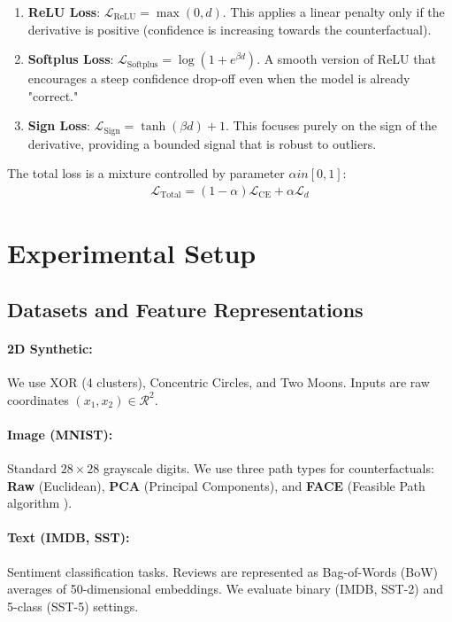 \documentclass[sigconf,anonymous]{aamas}
\begin{document}
\begin{enumerate}
    \item \textbf{ReLU Loss}: $\mathcal{L}_{\text{ReLU}} = \max(0, d)$. This applies a linear penalty only if the derivative is positive (confidence is increasing towards the counterfactual).
    \item \textbf{Softplus Loss}: $\mathcal{L}_{\text{Softplus}} = \log(1 + e^{\beta d})$. A smooth version of ReLU that encourages a steep confidence drop-off even when the model is already "correct."
    \item \textbf{Sign Loss}: $\mathcal{L}_{\text{Sign}} = \tanh(\beta d) + 1$. This focuses purely on the sign of the derivative, providing a bounded signal that is robust to outliers.
\end{enumerate}

The total loss is a mixture controlled by parameter $\alpha 
in [0,1]$:
\begin{align}\label{eq:total_loss}
    \mathcal{L}_{\text{Total}} = (1-\alpha)\mathcal{L}_{\textrm{CE}} + \alpha \mathcal{L}_{d}
\end{align}

\section{Experimental Setup}
\label{sec:experimental_setup}

\subsection{Datasets and Feature Representations}
\paragraph{2D Synthetic:} We use XOR (4 clusters), Concentric Circles, and Two Moons. Inputs are raw coordinates $(x_1, x_2) \in \mathcal{R}^2$.
\paragraph{Image (MNIST):} Standard $28\times28$ grayscale digits. We use three path types for counterfactuals: \textbf{Raw} (Euclidean), \textbf{PCA} (Principal Components), and \textbf{FACE} (Feasible Path algorithm \cite{poyiadzi2020face}).
\paragraph{Text (IMDB, SST):} Sentiment classification tasks. Reviews are represented as Bag-of-Words (BoW) averages of 50-dimensional embeddings. We evaluate binary (IMDB, SST-2) and 5-class (SST-5) settings.
\end{document}
